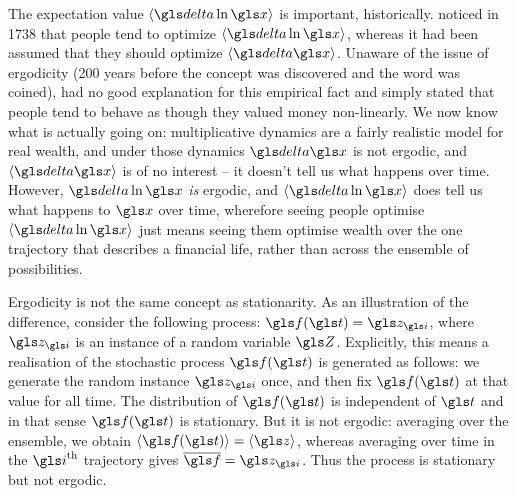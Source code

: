 The expectation value $\ave{\d \ln \x}$ is important, historically.  noticed in 
1738 \cite{Bernoulli1738} that people tend to
optimize $\ave{\d \ln \x}$, whereas it had been assumed that they should optimize $\ave{\d \x}$. 
Unaware of the issue of ergodicity (200 years before the concept was discovered 
and the word was coined),  had no good explanation for this 
empirical fact and simply stated that people tend to behave as though they valued
money non-linearly. We now know what is actually going on: multiplicative dynamics
are a fairly realistic model for real wealth, and under those dynamics
$\d \x$ is not ergodic, 
and $\ave{\d \x}$ is of no interest -- it doesn't tell us what happens over time. However,
$\d \ln \x$ {\it is} ergodic, and $\ave{\d \ln \x}$ does tell us what happens to $\x$ over time, 
wherefore seeing people optimise $\ave{\d \ln \x}$ just means seeing them optimise wealth 
over the one trajectory that describes a financial life, rather than across the ensemble of possibilities.


Ergodicity is not the same concept as stationarity. As an illustration of the difference, consider the following process: $\gf(\t)=\z_{\gi}$, where $\z_{\gi}$ is an instance of a random variable $\Z$. Explicitly, this means a realisation of the stochastic process $\gf(\t)$ is generated as follows: we generate the random instance $\z_{\gi}$ once, and then fix $\gf(\t)$ at that value for all time. The distribution of $\gf(\t)$ is independent of $\t$ and in that sense $\gf(\t)$ is stationary. But it is not ergodic: averaging over the ensemble, we obtain $\ave{\gf(\t)}=\ave{\z}$, whereas averaging over time in the $\gi^{\text{th}}$ trajectory gives $\overline{\gf}=\z_{\gi}$. Thus the process is stationary but not ergodic.

